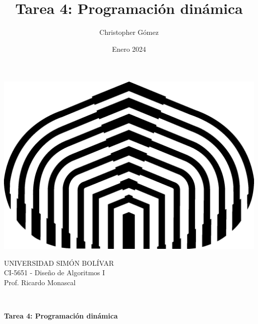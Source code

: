 \documentclass[letterpaper, 12pt]{article}
\title{Tarea 4: Programación dinámica}
\author{Christopher Gómez}
\date{Enero 2024}
\begin{document}
\parbox[t]{.5\linewidth}{
    \centering
    \includegraphics[scale=0.4]{logo.png}
    \begin{center}
        UNIVERSIDAD SIMÓN BOLÍVAR \\
        CI-5651 - Diseño de Algoritmos I \\
        Prof. Ricardo Monascal \\
    \end{center}
}
\hfill {}

\phantom{This text will be invisible} \\
\centerline {\textbf{Tarea 4: Programación dinámica}}
\justify
\end{document}
